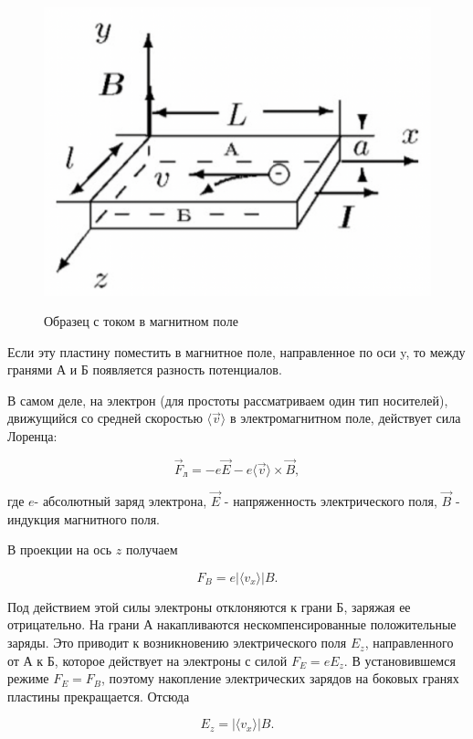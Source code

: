 \documentclass[11pt]{article}
\begin{document}
    \begin{figure}
        \vspace{-20pt}
        \begin{center}
            \includegraphics[width=0.7\linewidth]{holl.jpg}
            \label{fig:sdfsafd}
        \end{center}
        \vspace{-20pt}
        \caption{Образец с током в магнитном поле}
    \end{figure}

    Если эту пластину поместить в магнитное поле, направленное по оси y, то между гранями А и Б появляется разность потенциалов. 
    
    В самом деле, на электрон (для простоты рассматриваем один тип носителей), движущийся со средней скоростью $\langle \vec{v} \rangle$ в электромагнитном поле, действует сила Лоренца:
    
    $$\vec{F}_{л} = -e\vec{E}-e \langle \vec{v} \rangle \times \vec{B},$$
    
    где $e$- абсолютный заряд электрона, $\vec{E}$ - напряженность электрического поля, $\vec{B}$ - индукция магнитного поля.
    
    В проекции на ось $z$ получаем
    
    $$ F_{B}=e | \langle {v_{x}} \rangle | B.$$
    
    Под действием этой силы электроны отклоняются к грани Б, заряжая ее отрицательно. На грани А накапливаются нескомпенсированные положительные заряды. Это приводит к возникновению электрического поля $E_{z}$, направленного от А к Б, которое действует на электроны с силой $F_{E}=eE_{z}$. В установившемся режиме $F_{E}=F_{B}$, поэтому накопление электрических зарядов на боковых гранях пластины прекращается. Отсюда
    
    $$ E_{z}=| \langle {v_{x}} \rangle | B.$$
    
\end{document}
